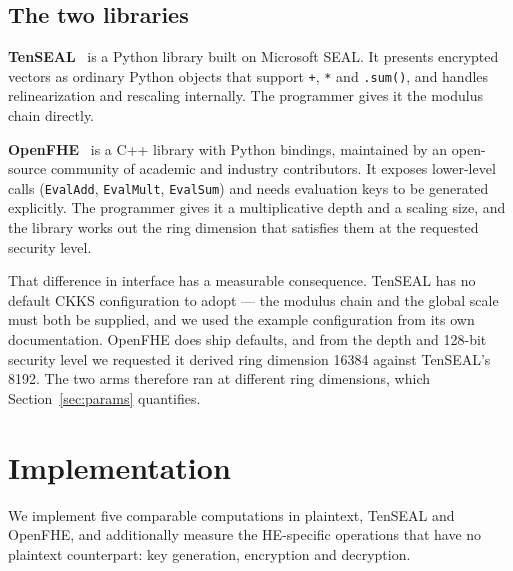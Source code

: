 \documentclass[11pt,a4paper]{article}
\begin{document}
\subsection{The two libraries}

\textbf{TenSEAL}~\cite{tenseal2021} is a Python library built on Microsoft SEAL. It presents encrypted
vectors as ordinary Python objects that support \texttt{+}, \texttt{*} and
\texttt{.sum()}, and handles relinearization and rescaling internally. The
programmer gives it the modulus chain directly.

\textbf{OpenFHE}~\cite{openfhe2022} is a C++ library with Python bindings,
maintained by an open-source community of academic and industry contributors. It exposes lower-level calls (\texttt{EvalAdd}, \texttt{EvalMult},
\texttt{EvalSum}) and needs evaluation keys to be generated explicitly. The
programmer gives it a multiplicative depth and a scaling size, and the library works
out the ring dimension that satisfies them at the requested security level.

That difference in interface has a measurable consequence. TenSEAL has no default
CKKS configuration to adopt --- the modulus chain and the global scale must both be
supplied, and we used the example configuration from its own documentation. OpenFHE
does ship defaults, and from the depth and 128-bit security level we requested it
derived ring dimension 16384 against TenSEAL's 8192. The two arms therefore ran at
different ring dimensions, which Section~\ref{sec:params} quantifies.

\section{Implementation}\label{sec:impl}

We implement five comparable computations in plaintext, TenSEAL and OpenFHE, and
additionally measure the HE-specific operations that have no plaintext counterpart:
key generation, encryption and decryption.
\end{document}
